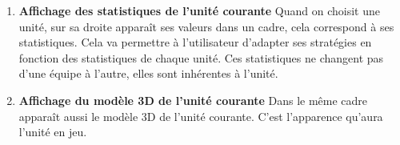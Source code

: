 \documentclass{report}
\begin{document}
\begin{enumerate}[label=\Alph*)]
\item\textbf{Affichage des statistiques de l'unité courante} \newline
Quand on choisit une unité, sur sa droite apparaît ses valeurs dans un cadre, cela correspond à ses statistiques. Cela va permettre à l'utilisateur d'adapter ses stratégies en fonction des statistiques de chaque unité.
Ces statistiques ne changent pas d'une équipe à l'autre, elles sont inhérentes à l'unité.
\item\textbf{Affichage du modèle 3D de l'unité courante} \newline
Dans le même cadre apparaît aussi le modèle 3D de l'unité courante. C'est l'apparence qu'aura l'unité en jeu.
\end{enumerate}


\end{document}
